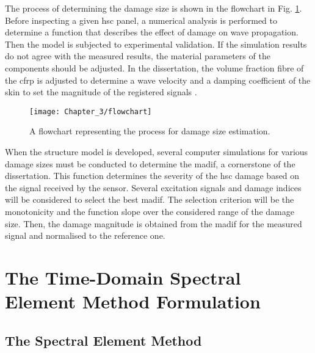 \documentclass[11pt,a4paper,final]{report}
\begin{document}
The process of determining the damage size is shown in the flowchart in Fig. \ref{fig:Flowchart}.
Before inspecting a given \ac{hsc} panel, a numerical analysis is performed to determine a function that describes the effect of damage on wave propagation.
Then the model is subjected to experimental validation.
If the simulation results do not agree with the measured results, the material parameters of the components should be adjusted.
In the dissertation, the volume fraction fibre of the \ac{cfrp} is adjusted to determine a wave velocity \cite{kudela2007modelling} and a damping coefficient of the skin to set the magnitude of the registered signals \cite{wandowski2017guided}.
\begin{figure}[H]
		\begin{center}
	\texttt{[image: Chapter\_3/flowchart]}
		\end{center}
	\caption{A flowchart representing the process for damage size estimation.}
	\label{fig:Flowchart}
\end{figure}

When the structure model is developed, several computer simulations for various damage sizes must be conducted to determine the \ac{madif}, a cornerstone of the dissertation. This function determines the severity of the \ac{hsc} damage based on the signal received by the sensor.
Several excitation signals and damage indices will be considered to select the best \ac{madif}.
The selection criterion will be the monotonicity and the function slope over the considered range of the damage size. Then, the damage magnitude is obtained from the \ac{madif} for the measured signal and normalised to the reference one.


 

\clearpage{}
\clearpage{}

\chapter[The Time-Domain Spectral Element Method Formulation]{The Time-Domain Spectral Element Method Formulation}
\label{ch:sem}





\section{The Spectral Element Method}
\label{sec:sem}
\end{document}

